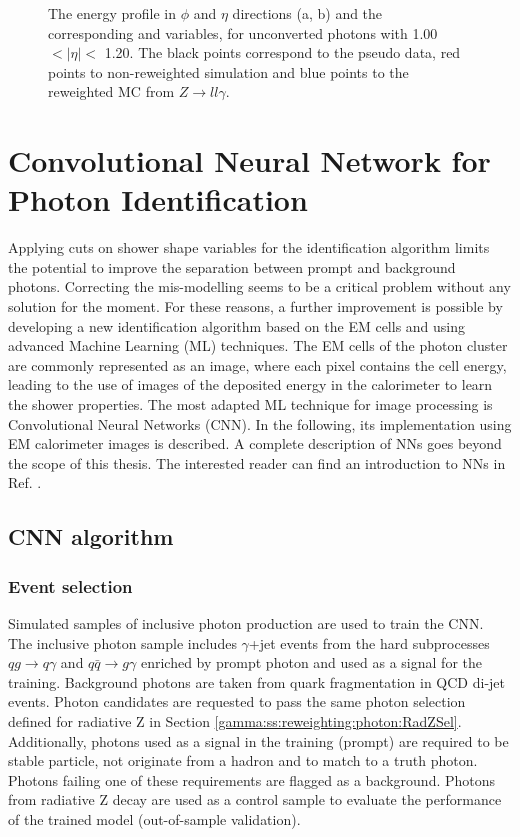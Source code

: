\begin{figure}[htbp]
	\begin{tcolorbox}[colback=black!5!white,colframe=white!75!black]
    \caption{The energy profile in $\phi$ and $\eta$ directions (a, b) and the corresponding \Rphi and \Reta variables, for unconverted photons with 1.00 $ < |\eta| < $ 1.20. The black points correspond to the pseudo data, red points to non-reweighted simulation and blue points to the reweighted MC from $Z\rightarrow ll\gamma$.}
    \label{fig:gamma:ss:reweighting:photon:3dreweighting}
    \end{tcolorbox}
\end{figure}

\section{Convolutional Neural Network for Photon Identification}
\label{gamma:CNN}
Applying cuts on shower shape variables for the identification algorithm limits the potential to improve the separation between prompt and background photons. Correcting the mis-modelling seems to be a critical problem without any solution for the moment. For these reasons, a further improvement is possible by developing a new identification algorithm based on the EM cells and using advanced Machine Learning (ML) techniques. The EM cells of the photon cluster are commonly represented as an image, where each pixel contains the cell energy, leading to the use of images of the deposited energy in the calorimeter to learn the shower properties. The most adapted ML technique for image processing is Convolutional Neural Networks (CNN). In the following, its implementation using EM calorimeter images is described. A complete description of NNs goes beyond the scope of this thesis. The interested reader can find an introduction to NNs in Ref. \cite{NNs}. 

\subsection{CNN algorithm}
\subsubsection{Event selection}
Simulated samples of inclusive photon production are used to train the CNN. The inclusive photon sample includes $\gamma$+jet events from the hard subprocesses $qg \rightarrow q\gamma$ and $ q\bar{q}\rightarrow g\gamma$ enriched by prompt photon and used as a signal for the training. Background photons are taken from quark fragmentation in QCD di-jet events. Photon candidates are requested to pass the same photon selection defined for radiative Z in Section \ref{gamma:ss:reweighting:photon:RadZSel}. Additionally, photons used as a signal in the training (prompt) are required to be stable particle, not originate from a hadron and to match to a truth photon. Photons failing one of these requirements are flagged as a background. Photons from radiative Z decay are used as a control sample to evaluate the performance of the trained model (out-of-sample validation).

